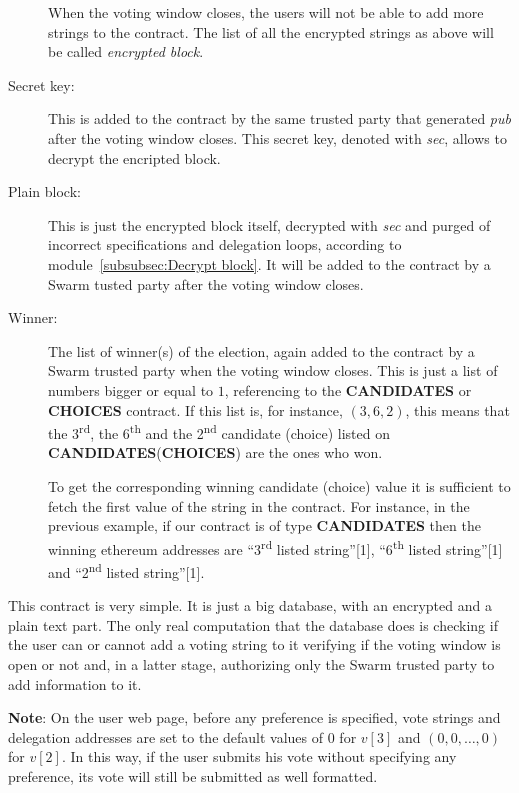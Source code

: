 \documentclass[submission, copyright,creativecommons,sharealike,noncommercial]{eptcs}
\newcommand{\Candidates}{\textbf{CANDIDATES}\xspace}
\newcommand{\Choices}{\textbf{CHOICES}\xspace}
\begin{document}
\begin{description}
		When the voting window closes, the users will not be able to add more strings to the contract. The list of all the encrypted strings as above will be called \emph{encrypted block}.
		
		\item[Secret key:] This is added to the contract by the same trusted party that generated \emph{pub} after the voting window closes. This secret key, denoted with \emph{sec}, allows to decrypt the encripted block.
		
		\item[Plain block:] This is just the encrypted block itself, decrypted with \emph{sec} and purged of incorrect specifications and delegation loops, according to module~\ref{subsubsec:Decrypt block}. It will be added to the contract by a Swarm tusted party after the voting window closes.
			
		\item[Winner:] The list of winner(s) of the election, again added to the contract by a Swarm trusted party when the voting window closes. This is just a list of numbers bigger or equal to $1$, referencing to the \Candidates or \Choices contract. If this list is, for instance, $(3,6,2)$, this means that the 3\textsuperscript{rd}, the 6\textsuperscript{th} and the 2\textsuperscript{nd} candidate (choice) listed on \Candidates (\Choices) are the ones who won. 
		
		To get the corresponding winning candidate (choice) value it is sufficient to fetch the first value of the string in the contract. For instance, in the previous example, if our contract is of type \Candidates then the winning ethereum addresses are ``3\textsuperscript{rd} listed string''[1], ``6\textsuperscript{th} listed string''[1] and ``2\textsuperscript{nd} listed string''[1].

	\end{description}
	This contract is very simple. It is just a big database, with an encrypted and a plain text part. The only real computation that the database does is checking if the user can or cannot add a voting string to it verifying if the voting window is open or not and, in a latter stage, authorizing only the Swarm trusted party to add information to it.

	\textbf{Note}: On the user web page, before any preference is specified, vote strings and delegation addresses are set to the default values of $0$ for $v[3]$ and $(0,0, \dots, 0)$ for $v[2]$. In this way, if the user submits his vote without specifying any preference, its vote will still be submitted as well formatted.
		
\end{document}
